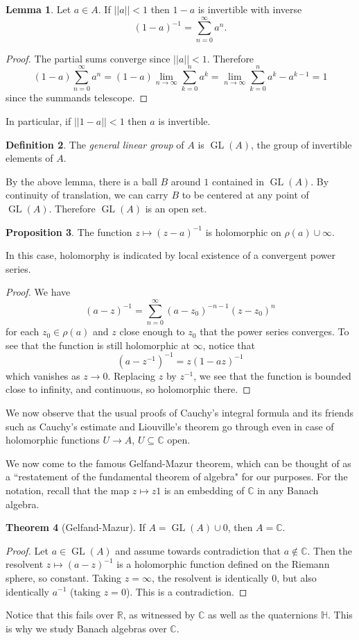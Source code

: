 \documentclass[12pt]{report}
\newcommand{\RR}{\mathbb{R}}
\newcommand{\CC}{\mathbb{C}}
\newcommand{\GL}{\operatorname{GL}}
\newcommand{\dfn}[1]{\emph{#1}\index{#1}}
\theoremstyle{definition}
\newtheorem{theorem}{Theorem}[chapter]
\newtheorem{lemma}[theorem]{Lemma}
\newtheorem{proposition}[theorem]{Proposition}
\newtheorem{definition}[theorem]{Definition}
\begin{document}
\begin{lemma}
    Let $a \in A$. If $||a|| < 1$ then $1 - a$ is invertible with inverse
    $$(1 - a)^{-1} = \sum_{n=0}^\infty a^n.$$
\end{lemma}
\begin{proof}
    The partial sums converge since $||a|| < 1$. Therefore
    $$(1 - a) \sum_{n=0}^\infty a^n = (1 - a) \lim_{n \to \infty} \sum_{k=0}^n a^k = \lim_{n \to \infty} \sum_{k=0}^n a^k - a^{k-1} = 1$$
    since the summands telescope.
\end{proof}
In particular, if $||1 - a|| < 1$ then $a$ is invertible.
\begin{definition}
    The \dfn{general linear group} of $A$ is $\GL(A)$, the group of invertible elements of $A$.
\end{definition}
By the above lemma, there is a ball $B$ around $1$ contained in $\GL(A)$. By continuity of translation, we can carry $B$ to be centered at any point of $\GL(A)$. Therefore $\GL(A)$ is an open set.

\begin{proposition}
    The function $z \mapsto (z - a)^{-1}$ is holomorphic on $\rho(a) \cup \infty$.
\end{proposition}
    In this case, holomorphy is indicated by local existence of a convergent power series.
\begin{proof}
    We have
    $$(a - z)^{-1} = \sum_{n=0}^\infty (a - z_0)^{-n-1}(z-z_0)^n$$
    for each $z_0 \in \rho(a)$ and $z$ close enough to $z_0$ that the power series converges. To see that the function is still holomorphic at $\infty$, notice that
    $$(a - z^{-1})^{-1} = z(1 - az)^{-1}$$
    which vanishes as $z \to 0$. Replacing $z$ by $z^{-1}$, we see that the function is bounded close to infinity, and continuous, so holomorphic there.
\end{proof}

We now observe that the usual proofs of Cauchy's integral formula and its friends such as Cauchy's estimate and Liouville's theorem go through even in case of holomorphic functions $U \to A$, $U \subseteq \CC$ open.

We now come to the famous Gelfand-Mazur theorem, which can be thought of as a ``restatement of the fundamental theorem of algebra" for our purposes. For the notation, recall that the map $z \mapsto z1$ is an embedding of $\CC$ in any Banach algebra.
\begin{theorem}[Gelfand-Mazur]
    If $A = \GL(A) \cup 0$, then $A = \CC$.
\end{theorem}
\begin{proof}
    Let $a \in \GL(A)$ and assume towards contradiction that $a \notin \CC$. Then the resolvent $z \mapsto (a - z)^{-1}$ is a holomorphic function defined on the Riemann sphere, so constant. Taking $z = \infty$, the resolvent is identically $0$, but also identically $a^{-1}$ (taking $z = 0$). This is a contradiction.
\end{proof}
Notice that this fails over $\RR$, as witnessed by $\CC$ as well as the quaternions $\mathbb H$. This is why we study Banach algebras over $\CC$.
\end{document}
